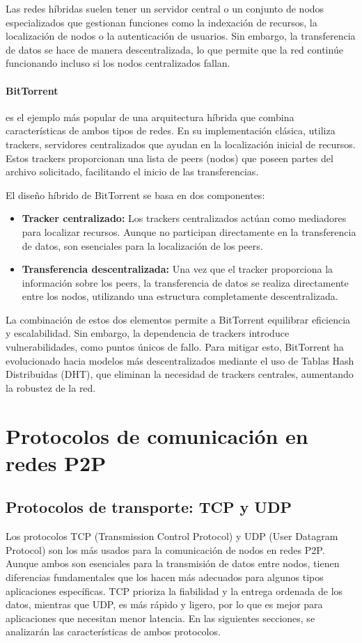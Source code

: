 Las redes híbridas suelen tener un servidor central o un conjunto de nodos especializados que gestionan funciones como la indexación de recursos,
la localización de nodos o la autenticación de usuarios.
Sin embargo, la transferencia de datos se hace de manera descentralizada, lo que permite que la red continúe funcionando incluso si los nodos centralizados fallan.

\paragraph{BitTorrent} es el ejemplo más popular de una arquitectura híbrida que combina características de ambos tipos de redes.
En su implementación clásica, utiliza trackers, servidores centralizados que ayudan en la localización inicial de recursos.
Estos trackers proporcionan una lista de peers (nodos) que poseen partes del archivo solicitado, facilitando el inicio de las transferencias.

El diseño híbrido de BitTorrent se basa en dos componentes:
\begin{itemize}
    \item \textbf{Tracker centralizado:} Los trackers centralizados actúan como mediadores para localizar recursos.
    Aunque no participan directamente en la transferencia de datos, son esenciales para la localización de los peers.
    \item \textbf{Transferencia descentralizada:} Una vez que el tracker proporciona la información sobre los peers, la transferencia de datos se realiza directamente entre los nodos, utilizando una estructura completamente descentralizada.
\end{itemize}

La combinación de estos dos elementos permite a BitTorrent equilibrar eficiencia y escalabilidad.
Sin embargo, la dependencia de trackers introduce vulnerabilidades, como puntos únicos de fallo.
Para mitigar esto, BitTorrent ha evolucionado hacia modelos más descentralizados mediante el uso de Tablas Hash Distribuidas (DHT), que eliminan la necesidad de trackers centrales,
aumentando la robustez de la red.

\section{Protocolos de comunicación en redes P2P}

\subsection{Protocolos de transporte: TCP y UDP}
Los protocolos TCP (Transmission Control Protocol) y UDP (User Datagram Protocol) son los más usados para la comunicación de nodos en redes P2P.
Aunque ambos son esenciales para la transmisión de datos entre nodos, tienen diferencias fundamentales que los hacen más adecuados para algunos tipos aplicaciones específicas.
TCP prioriza la fiabilidad y la entrega ordenada de los datos, mientras que UDP, es más rápido y ligero, por lo que es mejor para aplicaciones que necesitan menor latencia.
En las siguientes secciones, se analizarán las características de ambos protocolos.



